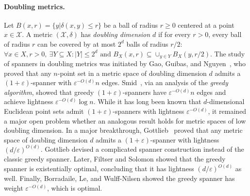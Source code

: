 \documentclass[11pt]{article}
\def\EMPH#1{\emph{\textcolor{BrickRed} {#1}}}
\newcommand{\cX}{\mathcal{X}}
\newcommand{\ddim}{\ensuremath{d}}
\newcommand{\atodo}[1]{\todo[linecolor=red,backgroundcolor=green!25,bordercolor=red]{\textbf{AF:~}#1}}
\begin{document}
\paragraph{Doubling metrics.} Let $B(x,r) = \{y | \delta(x,y)\leq r\}$ be a ball of radius $r\geq 0$ centered at a point $x\in \cX$. A metric $(\cX,\delta)$ has \EMPH{doubling dimension $\ddim$} if for every $r > 0$, every ball of radius $r$ can be covered by at most $2^{\ddim}$ balls of radius $r/2$: $\forall x\in X, r > 0,~\exists Y\subseteq X: |Y|\leq 2^{\ddim} \text{ and } B_X(x,r) \subseteq \cup_{y\in Y} B_X(y,r/2)$. 
The study of spanners in doubling metrics was initiated by Gao, Guibas, and Nguyen~\cite{gao2004deformable}, who proved that any $n$-point set in a metric space of doubling dimension $\ddim$ admits a $(1+\varepsilon)$-spanner with $\varepsilon^{-O(\ddim)} n$ edges.
Smid~\cite{smid2009weak}, via an analysis of the \EMPH{greedy algorithm}, showed that greedy $(1+\varepsilon)$-spanners have $\varepsilon^{-O(\ddim)} n$ edges and achieve lightness $\varepsilon^{-O(\ddim)} \log n$. While it has long been known that $d$-dimensional Euclidean point sets admit $(1+\varepsilon)$-spanners with lightness $\varepsilon^{-O(d)}$, it remained a major open problem whether an analogous result holds for metric spaces of low doubling dimension. 
In a major breakthrough, Gottlieb~\cite{gottlieb2015light} proved that any metric space of doubling dimension $\ddim$ admits a $(1+\varepsilon)$-spanner with lightness $(\ddim/\varepsilon)^{O(\ddim)}$. 
Gottlieb devised a complicated spanner construction instead of the classic greedy spanner.
Later, Filtser and Solomon \cite{FS20} showed that the greedy spanner is existentially optimal, concluding that it has lightness $(\ddim/\varepsilon)^{O(\ddim)}$ as well.
Finally, Borradaile, Le, and Wulff-Nilsen \cite{BLW19} showed the greedy spanner has
weight $\varepsilon^{-O(\ddim)}$, which is optimal.
%
\end{document}

